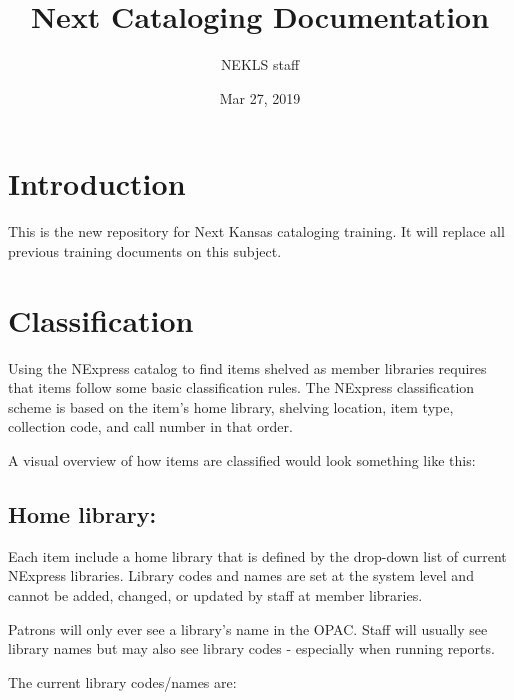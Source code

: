 \documentclass[letterpaper,10pt,english]{sphinxmanual}
\title{Next Cataloging Documentation}
\date{Mar 27, 2019}
\author{NEKLS staff}
\begin{document}
\maketitle
\sphinxtableofcontents
{}\label{\detokenize{index::doc}}



\chapter{Introduction}
\label{\detokenize{README:introduction}}\label{\detokenize{README::doc}}
This is the new repository for Next Kansas cataloging training. It will
replace all previous training documents on this subject.


\chapter{Classification}
\label{\detokenize{classification:classification}}\label{\detokenize{classification::doc}}
Using the NExpress catalog to find items shelved as member libraries
requires that items follow some basic classification rules. The NExpress
classification scheme is based on the item’s home library, shelving
location, item type, collection code, and call number \textendash{} in that order.

A visual overview of how items are classified would look something like
this:

\noindent{}


\section{Home library:}
\label{\detokenize{classification:home-library}}
Each item  include a home library that is defined by the
drop-down list of current NExpress libraries. Library codes and names
are set at the system level and cannot be added, changed, or updated by
staff at member libraries.

Patrons will only ever see a library’s name in the OPAC. Staff will
usually see library names but may also see library codes - especially
when running reports.

The current library codes/names are:
\end{document}
